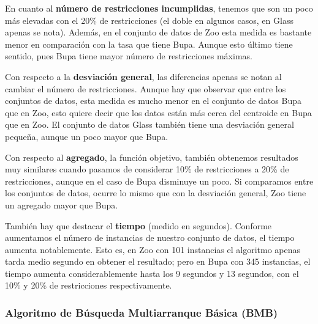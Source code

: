 En cuanto al \textbf{número de restricciones incumplidas}, tenemos que son un poco más elevadas con el 20\% de restricciones (el doble en algunos casos, en Glass apenas se nota). Además, 
en el conjunto de datos de Zoo esta medida es bastante menor en comparación con la tasa que tiene Bupa. Aunque esto último tiene sentido, pues Bupa tiene mayor número de restricciones máximas.

Con respecto a la \textbf{desviación general}, las diferencias apenas se notan al cambiar el número de restricciones. Aunque hay que observar que 
entre los conjuntos de datos, esta medida es mucho menor en el conjunto de datos Bupa que en Zoo, esto quiere decir que los datos están más cerca del centroide en Bupa que en Zoo.
El conjunto de datos Glass también tiene una desviación general pequeña, aunque un poco mayor que Bupa.

Con respecto al \textbf{agregado}, la función objetivo, también obtenemos resultados muy similares cuando pasamos de considerar 10\% de restricciones a 20\% de restricciones, aunque en el caso de Bupa disminuye un poco.
Si comparamos entre los conjuntos de datos, ocurre lo mismo que con la desviación general, Zoo tiene un agregado mayor que Bupa.

También hay que destacar el \textbf{tiempo} (medido en segundos). Conforme aumentamos el número de instancias de nuestro conjunto de datos, el tiempo aumenta notablemente. Esto es, en Zoo con 101 instancias el algoritmo apenas tarda medio segundo en obtener el resultado; 
pero en Bupa con 345 instancias, el tiempo aumenta considerablemente hasta los 9 segundos y 13 segundos, con el 10\% y 20\% de restricciones respectivamente.

\subsubsection{Algoritmo de Búsqueda Multiarranque Básica (BMB)}

